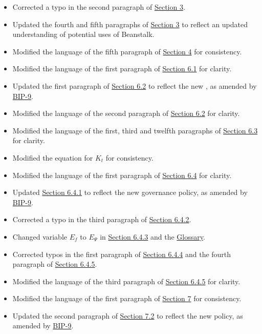 \documentclass[class=article, crop=false]{standalone}
\begin{document}
\begin{itemize}[topsep=0pt, itemsep=3pt,leftmargin=16pt]
\begin{itemize}
        \item Corrected a typo in the second paragraph of \hyperlink{section.3}{Section 3}.
        \item Updated the fourth and fifth paragraphs of \hyperlink{section.3}{Section 3} to reflect an updated understanding of potential uses of Beanstalk.
        \item Modified the language of the fifth paragraph of \hyperlink{section.4}{Section 4} for consistency.
        \item Modified the language of the first paragraph of \hyperlink{subsection.6.1}{Section 6.1} for clarity.
        \item Updated the first paragraph of \hyperlink{subsection.6.2}{Section 6.2} to reflect the new  , as amended by \href{https://bean.money/bip-9}{BIP-9}.
        \item Modified the language of the second paragraph of \hyperlink{subsection.6.2}{Section 6.2} for clarity.
        \item Modified the language of the first, third and twelfth paragraphs of \hyperlink{subsection.6.3}{Section 6.3} for clarity.
        \item Modified the equation for $K_t$ for consistency.
        \item Modified the language of the first paragraph of \hyperlink{subsection.6.4}{Section 6.4} for clarity.
        \item Updated \hyperlink{subsubsection.6.4.1}{Section 6.4.1} to reflect the new governance policy, as amended by \href{https://bean.money/bip-9}{BIP-9}.
        \item Corrected a typo in the third paragraph of \hyperlink{subsubsection.6.4.2}{Section 6.4.2}.
        \item Changed variable $E_f$ to $E_{\Psi}$ in \hyperlink{subsubsection.6.4.3}{Section 6.4.3} and the \hyperlink{subsection.14.11}{Glossary}.
        \item Corrected typos in the first paragraph of \hyperlink{subsubsection.6.4.4}{Section 6.4.4} and the fourth paragraph of \hyperlink{subsubsection.6.4.5}{Section 6.4.5}.
        \item Modified the language of the third paragraph of \hyperlink{subsubsection.6.4.5}{Section 6.4.5} for clarity.
        \item Modified the language of the first paragraph of \hyperlink{section.7}{Section 7} for consistency.
        \item Updated the second paragraph of \hyperlink{subsection.7.2}{Section 7.2} to reflect the new  policy, as amended by \href{https://bean.money/bip-9}{BIP-9}.

\end{itemize}
\end{itemize}
\end{document}
